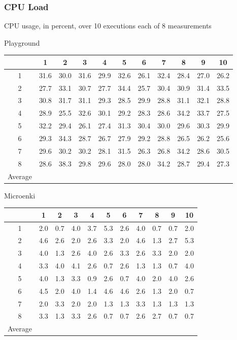 \subsubsection{CPU Load}
\begin{center}
    CPU usage, in percent, over 10 executions each of 8 measurements

    Playground\\
    \begin{tabular}{ |c|c|c|c|c|c|c|c|c|c|c| }
        \hline
          & 1 & 2 & 3 & 4 & 5 & 6 & 7 & 8 & 9 & 10 \\
        \hline
        \hline
        1 & 31.6 & 30.0 & 31.6 & 29.9 & 32.6 & 26.1 & 32.4 & 28.4 & 27.0 & 26.2 \\
        2 & 27.7 & 33.1 & 30.7 & 27.7 & 34.4 & 25.7 & 30.4 & 30.9 & 31.4 & 33.5 \\
        3 & 30.8 & 31.7 & 31.1 & 29.3 & 28.5 & 29.9 & 28.8 & 31.1 & 32.1 & 28.8 \\
        4 & 28.9 & 25.5 & 32.6 & 30.1 & 29.2 & 28.3 & 28.6 & 34.2 & 33.7 & 27.5 \\
        5 & 32.2 & 29.4 & 26.1 & 27.4 & 31.3 & 30.4 & 30.0 & 29.6 & 30.3 & 29.9 \\
        6 & 29.3 & 34.3 & 28.7 & 26.7 & 27.9 & 29.2 & 28.8 & 26.5 & 26.2 & 25.6 \\
        7 & 29.6 & 30.2 & 30.2 & 28.1 & 31.5 & 26.3 & 26.8 & 34.2 & 28.6 & 30.5 \\
        8 & 28.6 & 38.3 & 29.8 & 29.6 & 28.0 & 28.0 & 34.2 & 28.7 & 29.4 & 27.3 \\
        \hline
        \hline
        Average &  &   &   &   &   &   &   &   &   & \\
        \hline
    \end{tabular}

    Microenki\\
    \begin{tabular}{ |c|c|c|c|c|c|c|c|c|c|c| }
        \hline
          & 1 & 2 & 3 & 4 & 5 & 6 & 7 & 8 & 9 & 10 \\
        \hline
        \hline
        1 & 2.0 & 0.7 & 4.0 & 3.7 & 5.3 & 2.6 & 4.0 & 0.7 & 0.7 & 2.0 \\
        2 & 4.6 & 2.6 & 2.0 & 2.6 & 3.3 & 2.0 & 4.6 & 1.3 & 2.7 & 5.3 \\
        3 & 4.0 & 1.3 & 2.6 & 4.0 & 2.6 & 3.3 & 2.6 & 3.3 & 2.0 & 2.0 \\
        4 & 3.3 & 4.0 & 4.1 & 2.6 & 0.7 & 2.6 & 1.3 & 1.3 & 0.7 & 4.0 \\
        5 & 4.0 & 1.3 & 3.3 & 0.9 & 2.6 & 0.7 & 4.0 & 2.0 & 4.0 & 2.6 \\
        6 & 4.5 & 2.0 & 4.0 & 1.4 & 4.6 & 4.6 & 2.6 & 1.3 & 2.0 & 0.7 \\
        7 & 2.0 & 3.3 & 2.0 & 2.0 & 1.3 & 1.3 & 3.3 & 1.3 & 1.3 & 1.3 \\
        8 & 3.3 & 1.3 & 3.3 & 2.6 & 0.7 & 0.7 & 2.6 & 2.7 & 0.7 & 0.7 \\
        \hline
        \hline
        Average &  &   &   &   &   &   &   &   &   & \\
        \hline
    \end{tabular}
\end{center}

